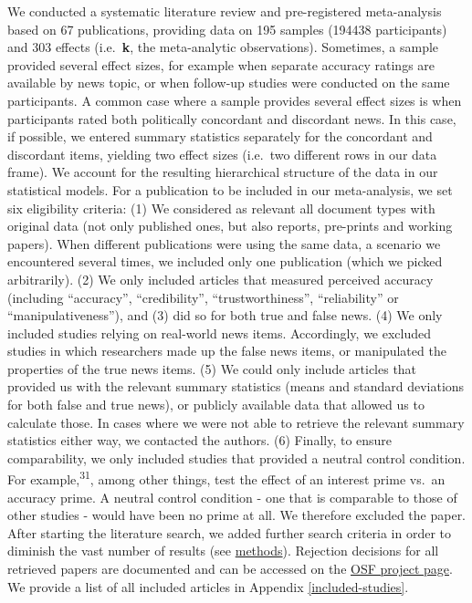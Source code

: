 \documentclass[
  man]{apa6}
\begin{document}
We conducted a systematic literature review and pre-registered meta-analysis based on 67 publications, providing data on 195 samples (194438 participants) and 303 effects (i.e.~\textbf{k}, the meta-analytic observations). Sometimes, a sample provided several effect sizes, for example when separate accuracy ratings are available by news topic, or when follow-up studies were conducted on the same participants. A common case where a sample provides several effect sizes is when participants rated both politically concordant and discordant news. In this case, if possible, we entered summary statistics separately for the concordant and discordant items, yielding two effect sizes (i.e.~two different rows in our data frame). We account for the resulting hierarchical structure of the data in our statistical models. For a publication to be included in our meta-analysis, we set six eligibility criteria: (1) We considered as relevant all document types with original data (not only published ones, but also reports, pre-prints and working papers). When different publications were using the same data, a scenario we encountered several times, we included only one publication (which we picked arbitrarily). (2) We only included articles that measured perceived accuracy (including ``accuracy'', ``credibility'', ``trustworthiness'', ``reliability'' or ``manipulativeness''), and (3) did so for both true and false news. (4) We only included studies relying on real-world news items. Accordingly, we excluded studies in which researchers made up the false news items, or manipulated the properties of the true news items. (5) We could only include articles that provided us with the relevant summary statistics (means and standard deviations for both false and true news), or publicly available data that allowed us to calculate those. In cases where we were not able to retrieve the relevant summary statistics either way, we contacted the authors. (6) Finally, to ensure comparability, we only included studies that provided a neutral control condition. For example,\textsuperscript{31}, among other things, test the effect of an interest prime vs.~an accuracy prime. A neutral control condition - one that is comparable to those of other studies - would have been no prime at all. We therefore excluded the paper. After starting the literature search, we added further search criteria in order to diminish the vast number of results (see \hyperref[methods]{methods}). Rejection decisions for all retrieved papers are documented and can be accessed on the \href{https://osf.io/96zbp/?view_only=d2f3147f652e44e2a0414d7d6d9a6c29}{OSF project page}. We provide a list of all included articles in Appendix \ref{included-studies}.
\end{document}
